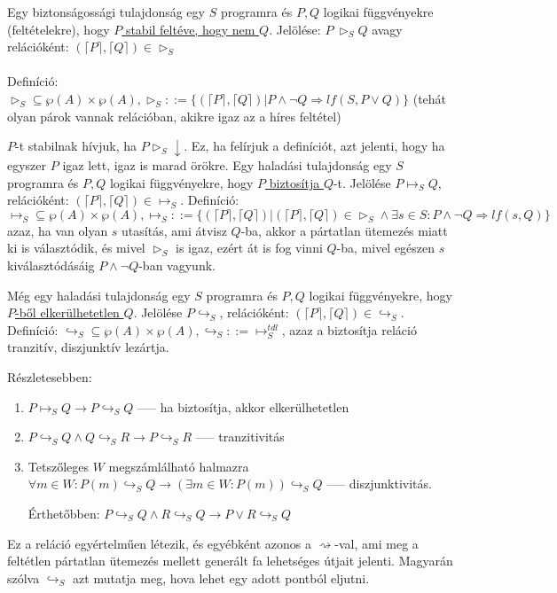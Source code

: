 \documentclass{article}
\begin{document}
Egy biztonságossági tulajdonság egy $S$ programra és $P,Q$ logikai függvényekre (feltételekre), hogy \underline{$P$ stabil feltéve, hogy nem $Q$}. Jelölése: $P\ \triangleright_S Q$ avagy relációként: $(\lceil P \rceil, \lceil Q \rceil) \in \triangleright_S$
\\\\
Definíció: $\triangleright_S \subseteq \wp(A) \times \wp(A), \triangleright_S ::=\lbrace (\lceil P \rceil, \lceil Q \rceil) | P \land \neg Q \Rightarrow lf(S, P \lor Q) \rbrace$ (tehát olyan párok vannak relációban, akikre igaz az a híres feltétel)

$P$-t stabilnak hívjuk, ha $P \triangleright_S \downarrow$. Ez, ha felírjuk a definíciót, azt jelenti, hogy ha egyszer $P$ igaz lett, igaz is marad örökre. Egy haladási tulajdonság egy $S$ programra és $P,Q$ logikai függvényekre, hogy \underline{$P$ biztosítja $Q$}-t. Jelölése $P \mapsto_S Q$, relációként: $(\lceil P \rceil, \lceil Q \rceil) \in \mapsto_S$. Definíció: $\mapsto_S \subseteq \wp(A) \times \wp(A), \mapsto_S::= \lbrace (\lceil P \rceil, \lceil Q \rceil ) | (\lceil P \rceil, \lceil Q \rceil) \in \triangleright_S \land \exists s \in S : P \land \neg Q \Rightarrow lf(s,Q)\rbrace$ azaz, ha van olyan $s$ utasítás, ami átvisz $Q$-ba, akkor a pártatlan ütemezés miatt ki is választódik, és mivel $\triangleright_S$ is igaz, ezért át is fog vinni $Q$-ba, mivel egészen $s$ kiválasztódásáig $P \land \neg Q$-ban vagyunk.

Még egy haladási tulajdonság egy $S$ programra és $P,Q$ logikai függvényekre, hogy \underline{$P$-ből elkerülhetetlen $Q$}. Jelölése $P \hookrightarrow_S$, relációként: $(\lceil P \rceil, \lceil Q \rceil) \in \hookrightarrow_S$. Definíció: $\hookrightarrow_S \subseteq \wp(A) \times \wp(A), \hookrightarrow_S ::= \mapsto_S^{tdl}$, azaz a biztosítja reláció tranzitív, diszjunktív lezártja.

Részletesebben:
\begin{enumerate}
\item $P \mapsto_S Q \longrightarrow P \hookrightarrow_S Q$ ----- ha biztosítja, akkor elkerülhetetlen
\item $P \hookrightarrow_S Q \land Q \hookrightarrow_S R \longrightarrow P \hookrightarrow_S R$ ----- tranzitivitás
\item Tetszőleges $W$ megszámlálható halmazra $\forall m \in W : P(m) \hookrightarrow_S Q \longrightarrow (\exists m \in W : P(m)) \hookrightarrow_S Q$ ----- diszjunktivitás.

Érthetőbben: $P \hookrightarrow_S Q \land R \hookrightarrow_S Q \rightarrow P \lor R \hookrightarrow_S Q$
\end{enumerate}
Ez a reláció egyértelműen létezik, és egyébként azonos a $\rightsquigarrow$-val, ami meg a feltétlen pártatlan ütemezés mellett generált fa lehetséges útjait jelenti. Magyarán szólva $\hookrightarrow_S$ azt mutatja meg, hova lehet egy adott pontból eljutni.
\end{document}

